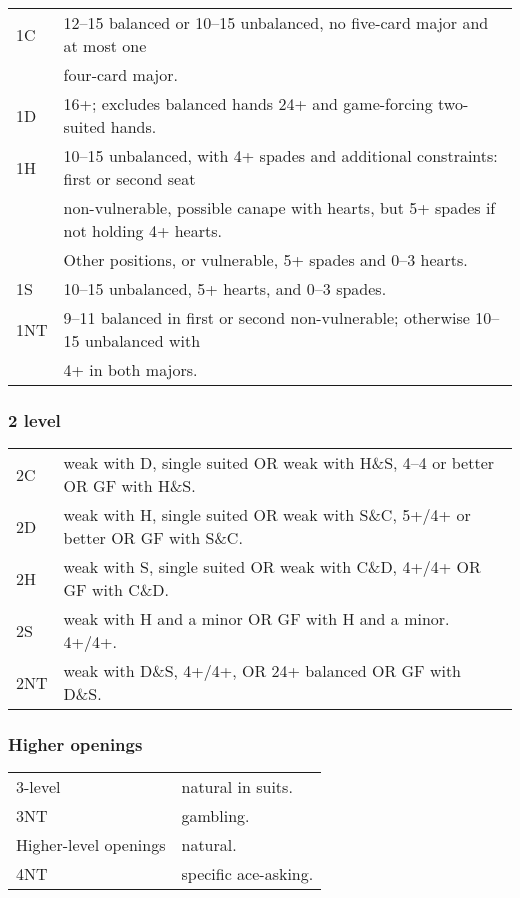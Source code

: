 \documentclass[a4paper,12pt]{article}
\begin{document}
\begin{tabular}{ll}
1C  & 12--15 balanced or 10--15 unbalanced, no five-card major and at most one \\
	 & four-card major.\\
1D  & 16+; excludes balanced hands 24+ and game-forcing two-suited hands.\\
1H  & 10--15 unbalanced, with 4+ spades and additional constraints: first or
      second seat\\
	 & non-vulnerable, possible canape with hearts, but 5+ spades if
      not holding 4+ hearts. \\
	 & Other positions, or vulnerable, 5+ spades and 0--3 hearts.\\
1S  & 10--15 unbalanced, 5+ hearts, and 0--3 spades.\\
1NT & 9--11 balanced in first or second non-vulnerable; otherwise 10--15
      unbalanced with \\
	 & 4+ in both majors.\\
\end{tabular}

\subsubsection{2 level}

\begin{tabular}{ll}
2C  & weak with D, single suited OR weak with H\&S, 4--4 or better OR GF with H\&S.\\
2D  & weak with H, single suited OR weak with S\&C, 5+/4+ or better OR GF with S\&C.\\
2H  & weak with S, single suited OR weak with C\&D, 4+/4+ OR GF with C\&D.\\
2S  & weak with H and a minor OR GF with H and a minor. 4+/4+.\\
2NT & weak with D\&S, 4+/4+, OR 24+ balanced OR GF with D\&S.\\
\end{tabular}

\subsubsection{Higher openings}

\begin{tabular}{ll}
3-level & natural in suits. \\
3NT & gambling. \\
Higher-level openings & natural. \\
4NT & specific ace-asking. \\
\end{tabular}
\end{document}
